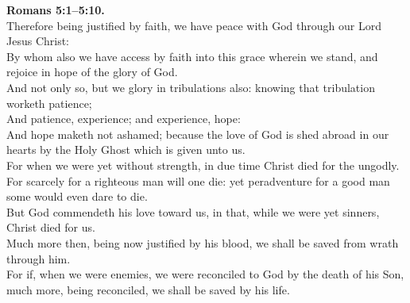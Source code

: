 \documentclass[10pt]{article} %
\begin{document}
{\begin{minipage}[t]{0.45\textwidth}
\textbf{Romans 5:1--5:10.}\\
Therefore being justified by faith, we have peace with God through our Lord Jesus Christ:\\
By whom also we have access by faith into this grace wherein we stand, and rejoice in hope of the glory of God.\\
And not only so, but we glory in tribulations also: knowing that tribulation worketh patience;\\
And patience, experience; and experience, hope:\\
And hope maketh not ashamed; because the love of God is shed abroad in our hearts by the Holy Ghost which is given unto us.\\
For when we were yet without strength, in due time Christ died for the ungodly.\\
For scarcely for a righteous man will one die: yet peradventure for a good man some would even dare to die.\\
But God commendeth his love toward us, in that, while we were yet sinners, Christ died for us.\\
Much more then, being now justified by his blood, we shall be saved from wrath through him.\\
For if, when we were enemies, we were reconciled to God by the death of his Son, much more, being reconciled, we shall be saved by his life.\\

\end{minipage}}
\vspace*{\fill}
\newpage
\Huge%
\vspace*{\fill}
\begin{spacing}{1.3}%
\end{spacing}
\vspace*{\fill}
\end{document}

